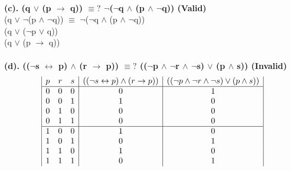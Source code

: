 \documentclass[a4paper]{article}
\begin{document}
\ \\
\textbf{(c). (q $\vee $ (p  $\rightarrow $ q)) $\equiv ?$ $\neg $($\neg $q $\wedge $ (p $\wedge $ $\neg $q)) (Valid)}\\
(q $\vee $ $\neg $(p $\wedge $ $\neg $q)) $\equiv $ $\neg $($\neg $q $\wedge $ (p $\wedge $ $\neg $q))\\
(q $\vee $ ($\neg $p $\vee $ q))\\
(q $\vee $ (p $\rightarrow $ q))
\\\\
\textbf{(d). (($\neg $s $\leftrightarrow $ p) $\wedge $ (r $\rightarrow $ p)) $\equiv ?$ (($\neg $p $\wedge $ $\neg $r $\wedge $ $\neg $s) $\vee $ (p $\wedge $ s)) (Invalid)}\\
\begin{displaymath}
    \begin{array}{|c c c|c|c|}
        p & r & s & ((\neg s \leftrightarrow p) \wedge (r \rightarrow p)) & ((\neg p \wedge \neg r \wedge \neg s) \vee (p \wedge s)) \\
        \hline
        0 & 0 & 0 & 0                                                     & 1                                                        \\
        0 & 0 & 1 & 1                                                     & 0                                                        \\
        0 & 1 & 0 & 0                                                     & 0                                                        \\
        0 & 1 & 1 & 0                                                     & 0                                                        \\
        \hline
        1 & 0 & 0 & 1                                                     & 0                                                        \\
        1 & 0 & 1 & 0                                                     & 1                                                        \\
        1 & 1 & 0 & 1                                                     & 0                                                        \\
        1 & 1 & 1 & 0                                                     & 1                                                        \\
    \end{array}
\end{displaymath}
\end{document}
